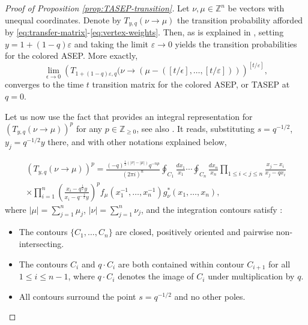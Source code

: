 \documentclass[11pt,reqno]{amsart}
\theoremstyle{definition}
\theoremstyle{remark}
\theoremstyle{remark}
\def\leq{\leqslant}
\def\geq{\geqslant}
\renewcommand\ge{\geq}
\def\Z{\mathbb Z}
\numberwithin{equation}{section}
\begin{document}
\begin{proof}[Proof of Proposition \ref{prop:TASEP-transition}]
		Let $\nu,\mu\in\Z^n$ be vectors with unequal coordinates. Denote by $T_{y,q}(\nu\to\mu)$ the transition probability afforded by  \eqref{eq:transfer-matrix}-\eqref{eq:vertex-weights}. Then, as is explained in \cite[Section 3.4.1]{deGier-Mead-Wheeler}, setting $y=1+(1-q)\varepsilon$ and taking the limit $\varepsilon\to 0$ yields the transition probabilities for the colored ASEP. More exactly, 
		\begin{equation}
			\label{eq:limit}
			\lim_{\epsilon\to 0} \left(T_{1+(1-q)\varepsilon,q}(\nu\to (\mu-([t/\epsilon],\dots,[t/\varepsilon]))\right)^{[t/\varepsilon]},
		\end{equation}
		converges to the time $t$ transition matrix for the colored ASEP, or TASEP at $q=0$. 
		
		Let us now use the fact that \cite[(9.5.2)]{BW-coloured} provides an integral representation for $(T_{y,q}(\nu\to\mu))^p$ for any $p\in\Z_{\ge 0}$, see also \cite[Theorem 3.4]{deGier-Mead-Wheeler}.
		It reads, substituting $s=q^{-1/2}$, $y_j=q^{-1/2} y$ there, and with other notations explained below,
		
		\begin{equation}
			\label{eq:Gmunu}
			\begin{gathered}
				(T_{y,q}(\nu\to\mu))^p	
				=	\frac{(-q)^{\frac 12(|\nu|-|\mu|)}q^{-np}}{(2\pi i)^n}  \oint_{C_1}
				\frac{dx_1}{x_1}
				\cdots 
				\oint_{C_n}
				\frac{dx_n}{x_n}
				\prod_{1 \leq i<j \leq n}
				\frac{x_j-x_i}{x_j-q x_i} \\
				\times
				\prod_{i=1}^{n}
				\left(\frac{x_i - q^{\frac 12} y}{x_i - q^{-\frac 12} y}\right)^p
				f_{\mu}({x}_1^{-1},\dots,{x}_n^{-1})
				g^{*}_{\nu}(x_1,\dots,x_n),
			\end{gathered}
		\end{equation}
		where $|\mu|=\sum_{j=1}^n \mu_j$, $|\nu|=\sum_{j=1}^n\nu_j$, and the integration contours satisfy \cite[Definition 8.1.1]{BW-coloured}:
		\begin{itemize}
			\item The contours $\{C_1,\dots,C_n\}$ are closed, positively oriented and pairwise non-intersecting.
			\item The contours $C_i$ and $q \cdot C_i$ are both contained within contour $C_{i+1}$ for all $1 \leq i \leq n-1$, where $q \cdot C_i$ denotes the image of $C_i$ under multiplication by $q$.
			\item All contours surround the point $s=q^{-1/2}$ and no other poles.
		\end{itemize} 
		

\end{proof}
\end{document}
